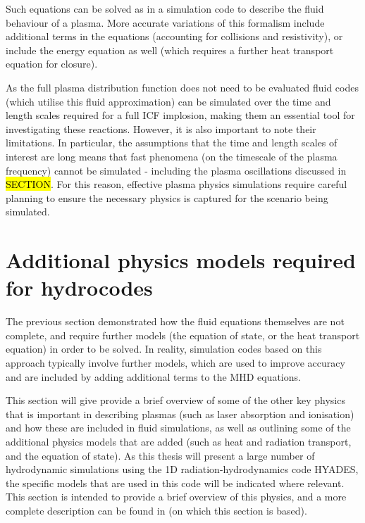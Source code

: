 Such equations can be solved as in a simulation code to describe the fluid behaviour of a plasma. More accurate variations of this formalism include additional terms in the equations (accounting for collisions and resistivity), or include the energy equation as well (which requires a further heat transport equation for closure). 

As the full plasma distribution function does not need to be evaluated fluid codes (which utilise this fluid approximation) can be simulated over the time and length scales required for a full ICF implosion, making them an essential tool for investigating these reactions. However, it is also important to note their limitations. In particular, the assumptions that the time and length scales of interest are long means that fast phenomena (on the timescale of the plasma frequency) cannot be simulated - including the plasma oscillations discussed in \hl{SECTION}. For this reason, effective plasma physics simulations require careful planning to ensure the necessary physics is captured for the scenario being simulated.



\section{Additional physics models required for hydrocodes}

The previous section demonstrated how the fluid equations themselves are not complete, and require further models (the equation of state, or the heat transport equation) in order to be solved. In reality, simulation codes based on this approach typically involve further models, which are used to improve accuracy and are included by adding additional terms to the MHD equations. 

This section will give provide a brief overview of some of the other key physics that is important in describing plasmas (such as laser absorption and ionisation) and how these are included in fluid simulations, as well as outlining some of the additional physics models that are added (such as heat and radiation transport, and the equation of state). As this thesis will  present a large number of hydrodynamic simulations using the 1D radiation-hydrodynamics code HYADES, the specific models that are used in this code will be indicated where relevant. This section is intended to provide a brief overview of this physics, and a more complete description can be found in  \cite{Colvin2013} (on which this section is based).

